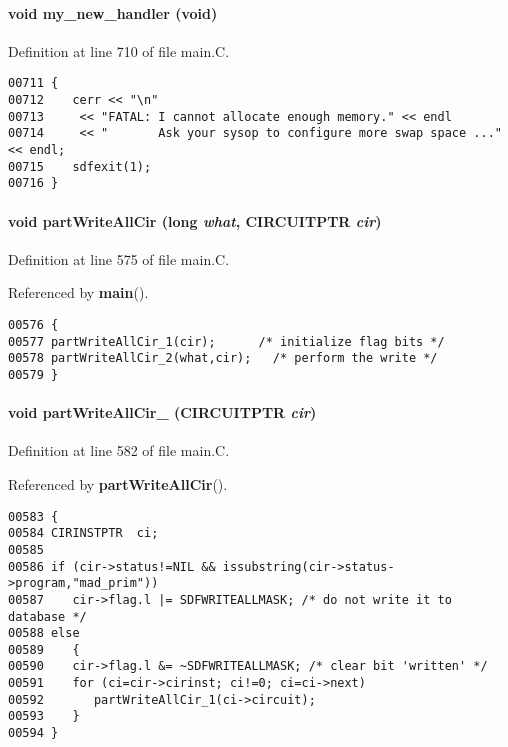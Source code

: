 \paragraph{\setlength{\rightskip}{0pt plus 5cm}void my\_\-new\_\-handler (void)\hspace{0.3cm}{\tt  [static]}}\hfill



Definition at line 710 of file main.C.\small\begin{verbatim}00711 {
00712    cerr << "\n"
00713     << "FATAL: I cannot allocate enough memory." << endl
00714     << "       Ask your sysop to configure more swap space ..." << endl;
00715    sdfexit(1);
00716 }
\end{verbatim}\normalsize 
\label{main.C_a10}
\paragraph{\setlength{\rightskip}{0pt plus 5cm}void part\-Write\-All\-Cir (long {\em what}, CIRCUITPTR {\em cir})\hspace{0.3cm}{\tt  [static]}}\hfill



Definition at line 575 of file main.C.

Referenced by {\bf main}().\small\begin{verbatim}00576 {
00577 partWriteAllCir_1(cir);      /* initialize flag bits */
00578 partWriteAllCir_2(what,cir);   /* perform the write */
00579 }
\end{verbatim}\normalsize 
\label{main.C_a11}
\paragraph{\setlength{\rightskip}{0pt plus 5cm}void part\-Write\-All\-Cir\_ (CIRCUITPTR {\em cir})\hspace{0.3cm}{\tt  [static]}}\hfill



Definition at line 582 of file main.C.

Referenced by {\bf part\-Write\-All\-Cir}().\small\begin{verbatim}00583 {
00584 CIRINSTPTR  ci;
00585 
00586 if (cir->status!=NIL && issubstring(cir->status->program,"mad_prim"))
00587    cir->flag.l |= SDFWRITEALLMASK; /* do not write it to database */
00588 else
00589    {
00590    cir->flag.l &= ~SDFWRITEALLMASK; /* clear bit 'written' */
00591    for (ci=cir->cirinst; ci!=0; ci=ci->next)
00592       partWriteAllCir_1(ci->circuit);
00593    }
00594 }
\end{verbatim}\normalsize 
\label{main.C_a12}
